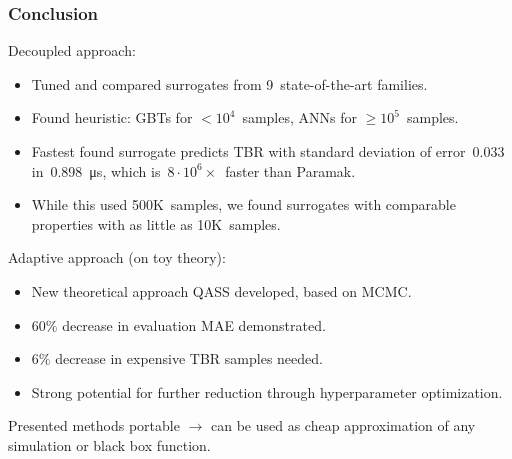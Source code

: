 \begin{frame}
	\frametitle{Conclusion}

	Decoupled approach:

	\begin{itemize}
		\item
			Tuned and compared surrogates from 9~state-of-the-art families.
		\item
			Found heuristic: GBTs for $<10^4$~samples,
			ANNs for $\geq10^5$~samples.
		\item
			Fastest found surrogate predicts TBR with standard deviation of
			error~$\num{0.033}$ in~\SI{0.898}{\micro\second}, which is~$8\cdot
			10^6\times$~faster than Paramak.
		\item
			While this used 500K~samples, we found surrogates with
			comparable properties with as little as 10K~samples.
	\end{itemize}

	\vspace{0.5em}

	Adaptive approach (on toy theory):
	\begin{itemize}
	    \item
	        New theoretical approach QASS developed, based on MCMC.
		\item 
			$60\%$ decrease in evaluation MAE demonstrated.
		\item
			$6\%$ decrease in expensive TBR samples needed.
		\item
			Strong potential for further reduction through hyperparameter optimization.
	\end{itemize}

	\vspace{0.5em}

	Presented methods portable $\rightarrow$ can be used as cheap
	approximation of any simulation or black box function.
\end{frame}

